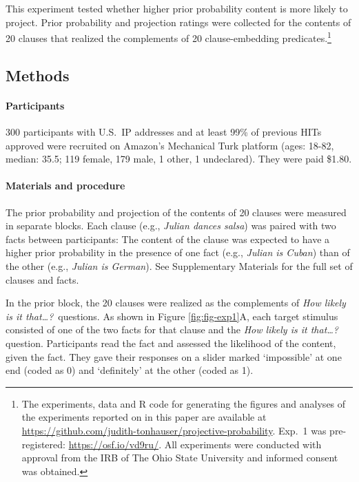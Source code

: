 \documentclass[OpenMind]{stjour}
\begin{document}
This experiment tested whether higher prior probability content is more likely to project. Prior probability and projection ratings were collected for the contents of 20 clauses that realized the complements of 20 clause-embedding predicates.\footnote{\label{f-github}The experiments, data and R code for generating the figures and analyses of the experiments reported on in this paper are available at \url{https://github.com/judith-tonhauser/projective-probability}. Exp.~1 was pre-registered: \url{https://osf.io/vd9ru/}. All experiments were conducted with approval from the IRB of The Ohio State University and informed consent was obtained.}%

\subsection{Methods} 
 
\paragraph{Participants} 300 participants with U.S.\ IP addresses and at least 99\% of previous HITs approved were recruited on Amazon's Mechanical Turk platform (ages: 18-82, median: 35.5; 119 female, 179 male, 1 other, 1 undeclared). They were paid \$1.80.

\paragraph{Materials and procedure} The prior probability and projection of the contents of 20 clauses were measured in separate blocks. Each clause (e.g., \emph{Julian dances salsa}) was paired with two facts between participants: The content of the clause was expected to have a higher prior probability in the presence of one fact (e.g., \emph{Julian is Cuban}) than of the other (e.g., \emph{Julian is German}). See Supplementary Materials for the full set of clauses and facts. 

In the prior block, the 20 clauses were realized as the complements of {\em How likely is it that\ldots?}~questions. As shown in Figure \ref{fig:fig-exp1}A, each target stimulus consisted of one of the two facts for that clause and the {\em How likely is it that\ldots?} question. 
Participants read the fact and assessed the likelihood of the content, given the fact. They gave their responses on a slider marked `impossible' at one end (coded as 0) and `definitely' at the other (coded as 1). 
\end{document}
